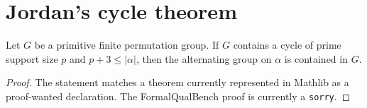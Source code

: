 \section{Jordan's cycle theorem}

\begin{theorem}
\label{thm:jordan-cycle}
\notready
Let $G$ be a primitive finite permutation group. If $G$ contains a cycle of prime support size $p$ and $p+3\le |\alpha|$, then the alternating group on $\alpha$ is contained in $G$.
\end{theorem}

\begin{proof}
The statement matches a theorem currently represented in Mathlib as a proof-wanted declaration. The FormalQualBench proof is currently a \texttt{sorry}.
\end{proof}
